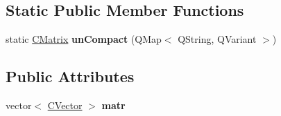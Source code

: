 \subsection*{Static Public Member Functions}
\begin{DoxyCompactItemize}
\item 
\mbox{\label{class_c_matrix_a32a449e82cd093f964566ef890c7b495}} 
static \hyperlink{class_c_matrix}{C\+Matrix} {\bfseries un\+Compact} (Q\+Map$<$ Q\+String, Q\+Variant $>$)
\end{DoxyCompactItemize}
\subsection*{Public Attributes}
\begin{DoxyCompactItemize}
\item 
\mbox{\label{class_c_matrix_a17f452f849a53e2a7ace69f601ca58bb}} 
vector$<$ \hyperlink{class_c_vector}{C\+Vector} $>$ {\bfseries matr}
\end{DoxyCompactItemize}
